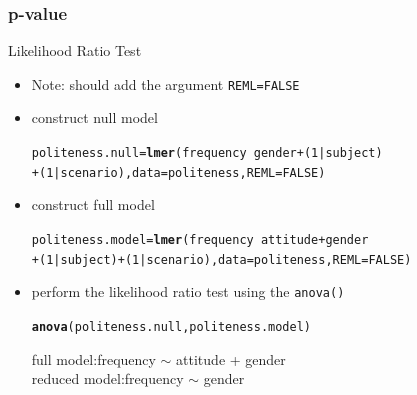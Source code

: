 \documentclass[10p]{beamer}\usepackage[]{graphicx}\usepackage[]{color}
\makeatletter
\newcommand{\hlnum}[1]{\textcolor[rgb]{0.686,0.059,0.569}{#1}}%
\newcommand{\hlopt}[1]{\textcolor[rgb]{0,0,0}{#1}}%
\newcommand{\hlstd}[1]{\textcolor[rgb]{0.345,0.345,0.345}{#1}}%
\newcommand{\hlkwb}[1]{\textcolor[rgb]{0.69,0.353,0.396}{#1}}%
\newcommand{\hlkwc}[1]{\textcolor[rgb]{0.333,0.667,0.333}{#1}}%
\newcommand{\hlkwd}[1]{\textcolor[rgb]{0.737,0.353,0.396}{\textbf{#1}}}%
\newenvironment{kframe}{%
 \def\at@end@of@kframe{}%
 \ifinner\ifhmode%
  \def\at@end@of@kframe{\end{minipage}}%
  \begin{minipage}{\columnwidth}%
 \fi\fi%
 \def\FrameCommand##1{\hskip\@totalleftmargin \hskip-\fboxsep
 \colorbox{shadecolor}{##1}\hskip-\fboxsep
     \hskip-\linewidth \hskip-\@totalleftmargin \hskip\columnwidth}%
 \MakeFramed {\advance\hsize-\width
   \@totalleftmargin\z@ \linewidth\hsize
   \@setminipage}}%
 {\par\unskip\endMakeFramed%
 \at@end@of@kframe}
\newenvironment{knitrout}{}{} %
\makeatother
\begin{document}
\begin{frame}[fragile]
\frametitle{p-value}
Likelihood Ratio Test
\begin{itemize}
\item Note: should add the argument \alert{\texttt{REML=FALSE}}
\item construct null model
\begin{knitrout}\scriptsize
{}\color{fgcolor}\begin{kframe}
\begin{alltt}
\hlstd{politeness.null} \hlkwb{=} \hlkwd{lmer}\hlstd{(frequency} \hlopt{~} \hlstd{gender} \hlopt{+} \hlstd{(}\hlnum{1}\hlopt{|}\hlstd{subject)}
        \hlopt{+} \hlstd{(}\hlnum{1}\hlopt{|}\hlstd{scenario),} \hlkwc{data}\hlstd{=politeness,} \hlkwc{REML}\hlstd{=}\hlnum{FALSE}\hlstd{)}
\end{alltt}
\end{kframe}
\end{knitrout}
\item construct full model
\begin{knitrout}\scriptsize
{}\color{fgcolor}\begin{kframe}
\begin{alltt}
\hlstd{politeness.model} \hlkwb{=} \hlkwd{lmer}\hlstd{(frequency} \hlopt{~} \hlstd{attitude} \hlopt{+} \hlstd{gender}
        \hlopt{+} \hlstd{(}\hlnum{1}\hlopt{|}\hlstd{subject)} \hlopt{+} \hlstd{(}\hlnum{1}\hlopt{|}\hlstd{scenario),} \hlkwc{data}\hlstd{=politeness,} \hlkwc{REML}\hlstd{=}\hlnum{FALSE}\hlstd{)}
\end{alltt}
\end{kframe}
\end{knitrout}
\item perform the likelihood ratio test using the \texttt{anova()}
\begin{knitrout}\scriptsize
{}\color{fgcolor}\begin{kframe}
\begin{alltt}
\hlkwd{anova}\hlstd{(politeness.null, politeness.model)}
\end{alltt}
\end{kframe}
\end{knitrout}
full model:\quad frequency $\sim$ attitude + gender \\
reduced model:\quad frequency $\sim$ gender


\end{itemize}
\end{frame}
\end{document}
